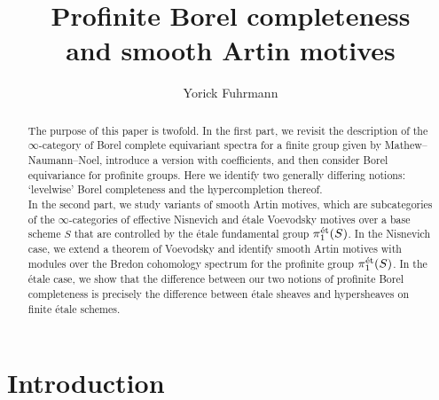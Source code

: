 \documentclass[reqno]{amsart}
\date{}
\author{Yorick Fuhrmann}
\numberwithin{equation}{section}\theoremstyle{thms}
\theoremstyle{defn}
\newcommand{\tn}[1]{\textnormal{#1}}
\begin{document}
\title[Profinite Borel completeness and smooth Artin motives]{Profinite Borel completeness \\ and smooth Artin motives}

\begin{abstract}
The purpose of this paper is twofold. In the first part, we revisit the description of the $\infty$-category of Borel complete equivariant spectra for a finite group given by Mathew--Naumann--Noel, introduce a version with coefficients, and then consider Borel equivariance for profinite groups. Here we identify two generally differing notions: `levelwise' Borel completeness and the hypercompletion thereof. \\
In the second part, we study variants of smooth Artin motives, which are subcategories of the $\infty$-categories of effective Nisnevich and étale Voevodsky motives over a base scheme $S$ that are controlled by the étale fundamental group $\pi_1^{\tn{ét}}(S)$. In the Nisnevich case, we extend a theorem of Voevodsky and identify smooth Artin motives with modules over the Bredon cohomology spectrum for the profinite group $\pi_1^{\tn{ét}}(S)$. In the étale case, we show that the difference between our two notions of profinite Borel completeness is precisely the difference between étale sheaves and hypersheaves on finite étale schemes.
\end{abstract}


\maketitle
\tableofcontents

\section{Introduction}\label{sec:intro}
\end{document}
